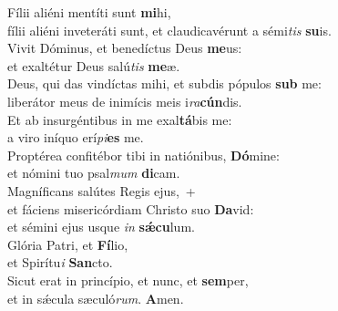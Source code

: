 \oddverse Fílii aliéni mentíti sunt \textbf{mi}hi,~\*\\
\oddverse fílii aliéni inveteráti sunt, et claudicavérunt a sémi\textit{tis} \textbf{su}is.\\
\evenverse Vivit Dóminus, et benedíctus Deus \textbf{me}us:~\*\\
\evenverse et exaltétur Deus salú\textit{tis} \textbf{me}æ.\\
\oddverse Deus, qui das vindíctas mihi, et subdis pópulos \textbf{sub} me:~\*\\
\oddverse liberátor meus de inimícis meis i\textit{ra}\textbf{cún}dis.\\
\evenverse Et ab insurgéntibus in me exal\textbf{tá}bis me:~\*\\
\evenverse a viro iníquo erí\textit{pi}\textbf{es} me.\\
\oddverse Proptérea confitébor tibi in natiónibus, \textbf{Dó}mine:~\*\\
\oddverse et nómini tuo psal\textit{mum} \textbf{di}cam.\\
\evenverse Magníficans salútes Regis ejus,~+\\
\evenverse  et fáciens misericórdiam Christo suo \textbf{Da}vid:~\*\\
\evenverse et sémini ejus usque \textit{in} \textbf{sǽ}\textbf{cu}lum.\\
\oddverse Glória Patri, et \textbf{Fí}lio,~\*\\
\oddverse et Spirítu\textit{i} \textbf{San}cto.\\
\evenverse Sicut erat in princípio, et nunc, et \textbf{sem}per,~\*\\
\evenverse et in sǽcula sæculó\textit{rum}. \textbf{A}men.\\

